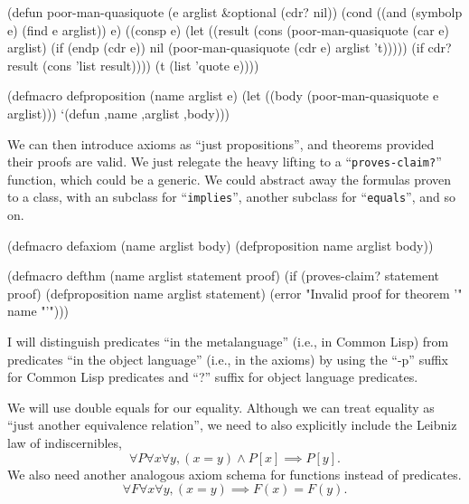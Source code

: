 \begin{code}[name=axioms, caption={Defining a proposition}]
(defun poor-man-quasiquote (e arglist &optional (cdr? nil))
  (cond
    ((and (symbolp e)
          (find e arglist)) e)
    ((consp e) (let ((result (cons (poor-man-quasiquote (car e) arglist)
                                   (if (endp (cdr e))
                                       nil
                                       (poor-man-quasiquote (cdr e) arglist 't)))))
                 (if cdr?
                     result
                     (cons 'list result))))
    (t (list 'quote e))))

(defmacro defproposition (name arglist e)
  (let ((body (poor-man-quasiquote e arglist)))
    `(defun ,name ,arglist ,body)))
\end{code}

We can then introduce axioms as ``just propositions'', and theorems
provided their proofs are valid. We just relegate the heavy lifting to a 
``\lstinline[language=lisp]{proves-claim?}'' function, which could be a
generic. We could abstract away the formulas proven to a class, with an
subclass for ``\lstinline[language=lisp]{implies}'', another subclass for
``\lstinline[language=lisp]{equals}'', and so on.

\begin{code}[name=axioms]
(defmacro defaxiom (name arglist body)
  (defproposition name arglist body))

(defmacro defthm (name arglist statement proof)
  (if (proves-claim? statement proof)
    (defproposition name arglist statement)
    (error "Invalid proof for theorem '" name "'")))
\end{code}

I will distinguish predicates ``in the metalanguage'' (i.e., in Common
Lisp) from predicates ``in the object language'' (i.e., in the axioms)
by using the ``-p'' suffix for Common Lisp predicates and ``?'' suffix
for object language predicates.

We will use double equals for our equality. Although we can treat
equality as ``just another equivalence relation'', we need to also
explicitly include the Leibniz law of indiscernibles,
\begin{equation}
\forall P\forall x\forall y, (x=y)\land P[x]\implies P[y].
\end{equation}
We also need another analogous axiom schema for functions instead of
predicates.
\begin{equation}
\forall F\forall x\forall y, (x=y)\implies F(x) = F(y).
\end{equation}

